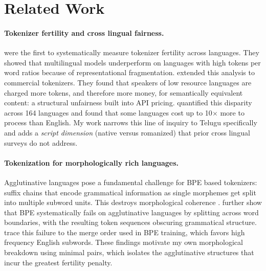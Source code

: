 ﻿\documentclass[11pt]{article}
\begin{document}
\section{Related Work}

\paragraph{Tokenizer fertility and cross lingual fairness.}
\citet{rust-etal-2021-how} were the first to systematically measure
tokenizer fertility across languages. They showed that multilingual
models underperform on languages with high tokens per word ratios
because of representational fragmentation. \citet{petrov-etal-2023-language}
extended this analysis to commercial tokenizers. They found that
speakers of low resource languages are charged more tokens, and
therefore more money, for semantically equivalent content: a
structural unfairness built into API pricing.
\citet{ahia-etal-2023-languages} quantified this disparity across
164 languages and found that some languages cost up to 10$\times$
more to process than English. My work narrows this line of inquiry
to Telugu specifically and adds a \textit{script dimension} (native
versus romanized) that prior cross lingual surveys do not address.

\paragraph{Tokenization for morphologically rich languages.}
Agglutinative languages pose a fundamental challenge for BPE based
tokenizers: suffix chains that encode grammatical information as
single morphemes get split into multiple subword units. This
destroys morphological coherence \citep{bostrom-durrett-2020-byte}.
\citet{bostrom-durrett-2020-byte} further show that BPE
systematically fails on agglutinative languages by splitting across
word boundaries, with the resulting token sequences obscuring
grammatical structure.
\citet{gutierrez-vasques-etal-2021-characters} trace this failure to
the merge order used in BPE training, which favors high frequency
English subwords. These findings motivate my own morphological
breakdown using minimal pairs, which isolates the agglutinative
structures that incur the greatest fertility penalty.
\end{document}
